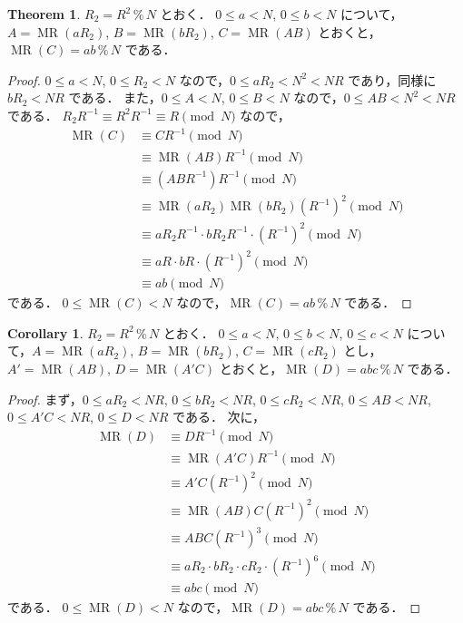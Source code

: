 \documentclass[twocolumn, uplatex, dvipdfmx]{jsarticle}
\renewcommand{\le}{\leqslant}
\numberwithin{equation}{section}
\theoremstyle{definition}
\newtheorem{thm}{Theorem}[section]
\newtheorem{cor}{Corollary}[section]
\newcommand{\Mod}{\,\texttt{\%}\,}
\DeclareMathOperator{\MR}{\mathrm{MR}}
\begin{document}
\begin{thm}
	$R_2=R^2\Mod N$ とおく．
	$0\le a<N$, $0\le b<N$ について，$A=\MR(aR_2)$, $B=\MR(bR_2)$, $C=\MR(AB)$ とおくと，$\MR(C)=ab\Mod N$ である．
\end{thm}
\begin{proof}
	$0\le a<N$, $0\le R_2<N$ なので，$0\le aR_2<N^2<NR$ であり，同様に $bR_2<NR$ である．
	また，$0\le A<N$, $0\le B<N$  なので，$0\le AB<N^2<NR$ である．
	$R_2R^{-1}\equiv R^2R^{-1}\equiv R\pmod{N}$ なので，
	\begin{align*}
		\MR(C)&\equiv CR^{-1}\pmod{N}\\
		&\equiv\MR(AB)R^{-1}\pmod{N}\\
		&\equiv(ABR^{-1})R^{-1}\pmod{N}\\
		&\equiv\MR(aR_2)\MR(bR_2)(R^{-1})^2\pmod{N}\\
		&\equiv aR_2R^{-1}\cdot bR_2R^{-1}\cdot (R^{-1})^2\pmod{N}\\
		&\equiv aR\cdot bR\cdot (R^{-1})^2\pmod{N}\\
		&\equiv ab\pmod{N}
	\end{align*}
	である．
	$0\le \MR(C)<N$ なので，$\MR(C)=ab\Mod N$ である．
\end{proof}

\begin{cor}
	$R_2=R^2\Mod N$ とおく．
	$0\le a<N$, $0\le b<N$, $0\le c<N$ について，$A=\MR(aR_2)$, $B=\MR(bR_2)$, $C=\MR(cR_2)$ とし，$A'=\MR(AB)$, $D=\MR(A'C)$ とおくと，$\MR(D)=abc\Mod N$ である．
\end{cor}
\begin{proof}
	まず，$0\le aR_2<NR$, $0\le bR_2<NR$, $0\le cR_2<NR$, $0\le AB<NR$, $0\le A'C<NR$, $0\le D<NR$ である．
	次に，
	\begin{align*}
		\MR(D)&\equiv DR^{-1}\pmod{N}\\
		&\equiv \MR(A'C)R^{-1}\pmod{N}\\
		&\equiv A'C(R^{-1})^2\pmod{N}\\
		&\equiv \MR(AB)C(R^{-1})^2\pmod{N}\\
		&\equiv ABC(R^{-1})^3\pmod{N}\\
		&\equiv aR_2\cdot bR_2\cdot cR_2\cdot(R^{-1})^6\pmod{N}\\
		&\equiv abc\pmod{N}
	\end{align*}
	である．
	$0\le\MR(D)<N$ なので，$\MR(D)=abc\Mod N$ である．
\end{proof}
\end{document}

